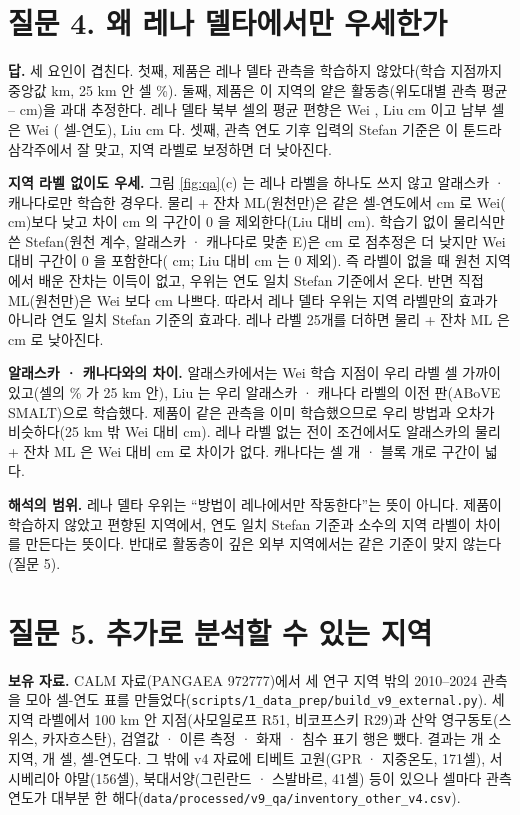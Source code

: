 \documentclass[10pt]{article}
\begin{document}
\section{질문 4. 왜 레나 델타에서만 우세한가}
\textbf{답.} 세 요인이 겹친다. 첫째, 제품은 레나 델타 관측을 학습하지 않았다(학습 지점까지 중앙값 \ndistweiLemed{} km, 25 km 안 셀 \ndistweiLele{} \%). 둘째, 제품은 이 지역의 얕은 활동층(위도대별 관측 평균 \nbiasobsLeSouth--\nbiasobsLeNorth{} cm)을 과대 추정한다. 레나 델타 북부 셀의 평균 편향은 Wei \nbiasLeNorthWei, Liu \nbiasLeNorthLiu{} cm 이고 남부 셀은 Wei \nbiasLeSouthWei(\nbiasnLeSouthWei{} 셀-연도), Liu \nbiasLeSouthLiu{} cm 다. 셋째, 관측 연도 기후 입력의 Stefan 기준은 이 툰드라 삼각주에서 잘 맞고, 지역 라벨로 보정하면 더 낮아진다.

\textbf{지역 라벨 없이도 우세.} 그림 \ref{fig:qa}(c) 는 레나 라벨을 하나도 쓰지 않고 알래스카 · 캐나다로만 학습한 경우다. 물리 + 잔차 ML(원천만)은 같은 셀-연도에서 \ntlvprmseLeRsWeizero{} cm 로 Wei(\ntlvprmseLeWeizero{} cm)보다 낮고 차이 \ntlvpLeRsWeizero{} cm 의 구간이 0 을 제외한다(Liu 대비 \ntlvpLeRsLiuzero{} cm). 학습기 없이 물리식만 쓴 Stefan(원천 계수, 알래스카 · 캐나다로 맞춘 E)은 \ntlvprmseLePzWeizero{} cm 로 점추정은 더 낮지만 Wei 대비 구간이 0 을 포함한다(\ntlvpLePzWeizero{} cm; Liu 대비 \ntlvpLePzLiuzero{} cm 는 0 제외). 즉 라벨이 없을 때 원천 지역에서 배운 잔차는 이득이 없고, 우위는 연도 일치 Stefan 기준에서 온다. 반면 직접 ML(원천만)은 Wei 보다 \ntlvpLeDsWeizero{} cm 나쁘다. 따라서 레나 델타 우위는 지역 라벨만의 효과가 아니라 연도 일치 Stefan 기준의 효과다. 레나 라벨 25개를 더하면 물리 + 잔차 ML 은 \ntlvprmseLeRsWeitwfive{} cm 로 낮아진다.

\textbf{알래스카 · 캐나다와의 차이.} 알래스카에서는 Wei 학습 지점이 우리 라벨 셀 가까이 있고(셀의 \ndistweiAkle{} \% 가 25 km 안), Liu 는 우리 알래스카 · 캐나다 라벨의 이전 판(ABoVE SMALT)으로 학습했다. 제품이 같은 관측을 이미 학습했으므로 우리 방법과 오차가 비슷하다(25 km 밖 Wei 대비 \ndprodAkweiRomask{} cm). 레나 라벨 없는 전이 조건에서도 알래스카의 물리 + 잔차 ML 은 Wei 대비 \ntlvpAkRsWeizero{} cm 로 차이가 없다. 캐나다는 셀 \nncellCa 개 · 블록 \nnblkCa 개로 구간이 넓다.

\textbf{해석의 범위.} 레나 델타 우위는 ``방법이 레나에서만 작동한다''는 뜻이 아니다. 제품이 학습하지 않았고 편향된 지역에서, 연도 일치 Stefan 기준과 소수의 지역 라벨이 차이를 만든다는 뜻이다. 반대로 활동층이 깊은 외부 지역에서는 같은 기준이 맞지 않는다(질문 5).

\section{질문 5. 추가로 분석할 수 있는 지역}
\textbf{보유 자료.} CALM 자료(PANGAEA 972777)에서 세 연구 지역 밖의 2010--2024 관측을 모아 셀-연도 표를 만들었다(\texttt{scripts/1\_data\_prep/build\_v9\_external.py}). 세 지역 라벨에서 100 km 안 지점(사모일로프 R51, 비코프스키 R29)과 산악 영구동토(스위스, 카자흐스탄), 검열값 · 이른 측정 · 화재 · 침수 표기 행은 뺐다. 결과는 \nextsubs{}개 소지역, \nextcells{}개 셀, \nextcy{} 셀-연도다. 그 밖에 v4 자료에 티베트 고원(GPR · 지중온도, 171셀), 서시베리아 야말(156셀), 북대서양(그린란드 · 스발바르, 41셀) 등이 있으나 셀마다 관측 연도가 대부분 한 해다(\texttt{data/processed/v9\_qa/inventory\_other\_v4.csv}).
\end{document}
